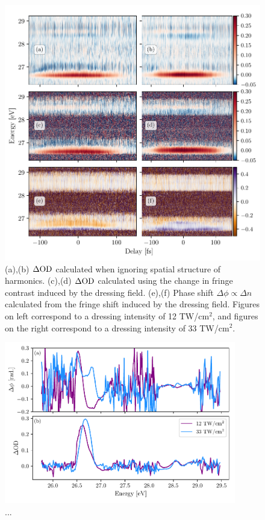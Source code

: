 \begin{figure}
	\centering
	\includegraphics[width=1.0\textwidth]{figures/CATS/delay_high_low.pdf}
	\caption[Delay-dependent $\dod$ and $\Delta \phi$ measured at high and moderate dressing intensities]{(a),(b) $\dod$ calculated when ignoring spatial structure of harmonics.  (c),(d)  $\dod$ calculated using the change in fringe contrast induced by the dressing field.  (e),(f) Phase shift $\Delta\phi\propto\Delta n $ calculated from the fringe shift induced by the dressing field.  Figures on left correspond to a dressing intensity of 12 TW/cm$^2$, and figures on the right correspond to a dressing intensity of 33 TW/cm$^2$.}
	\label{fig:delay_high_low}
\end{figure}


\begin{figure}
	\centering
	\includegraphics[width=0.9\textwidth]{figures/CATS/dphi_dod_lineout.pdf}
	\caption[...]{...}
	\label{fig:dphi_dod_lineout}
\end{figure}

